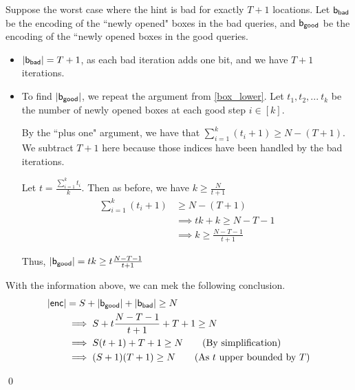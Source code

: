 Suppose the worst case where the hint is bad for exactly $T+1$ locations. Let ${\sf b_{bad}}$ be the encoding of the ``newly opened" boxes in the bad queries, and ${\sf b_{good}}$ be the encoding of the ``newly opened boxes in the good queries.
\begin{itemize}
    \item $|{\sf b_{bad}}| = T + 1$, as each bad iteration adds one bit, and we have $T+1$ iterations.
    \item To find $|{\sf b_{good}}|$, we repeat the argument from \ref{box_lower}. Let $t_1, t_2, ...\ t_k$ be the number of newly opened boxes at each good step $i \in [k]$.

    By the ``plus one" argument, we have that $\sum_{i = 1}^k (t_i + 1)\ge N - (T + 1)$. We subtract $T + 1$ here because those indices have been handled by the bad iterations.
    
    Let $t = \frac{\sum_{i = 1}^k t_i}{k}$. Then as before, we have $k\ge \frac{N}{t+1}$
    \begin{align*}
        \sum_{i = 1}^k (t_i + 1)&\ge N - (T + 1) \\
        &\implies tk + k \ge N - T - 1 \\
        &\implies k \ge \frac{N - T - 1}{t+1}
    \end{align*}

    Thus, $|{\sf b_{good}}| = tk \ge t\frac{N - T - 1}{t+1}$
\end{itemize}

With the information above, we can mek the following conclusion.
\begin{align*}
    |{\sf enc}| &= S + |{\sf b_{good}}| + |{\sf b_{bad}}| \ge N \\
    &\implies S + t\frac{N - T - 1}{t+1} + T + 1 \ge N \\
    &\implies S(t+1) + T + 1 \ge N \tag{By simplification}\\
    &\implies (S+1)(T+1) \ge N \tag{As $t$ upper bounded by $T$}
\end{align*}

\qed
